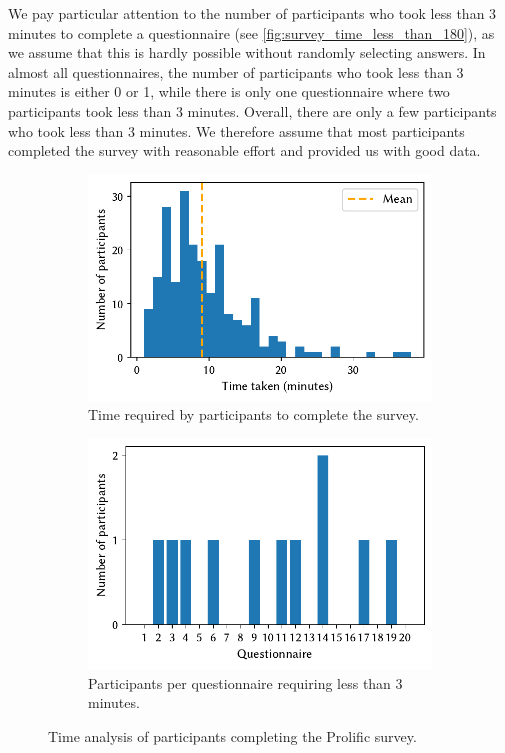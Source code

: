 \documentclass[%
class=scrreprt,
chapterprefix=false,%
open=right,%
twoside=false,%
paper=a4,%
logofile={Logo\_zentral\_farbig\_EN.png},%
thesistype=master,%
UKenglish,%
]{se2thesis}
\theoremstyle{definition}
\begin{document}
	We pay particular attention to the number of participants who took less than 3 minutes to complete a questionnaire (see \autoref{fig:survey_time_less_than_180}), as we assume that this is hardly possible without randomly selecting answers. In almost all questionnaires, the number of participants who took less than 3 minutes is either 0 or 1, while there is only one questionnaire where two participants took less than 3 minutes.
	Overall, there are only a few participants who took less than 3 minutes. We therefore assume that most participants completed the survey with reasonable effort and provided us with good data.
		
	\begin{figure}[tb]
		\centering
		\begin{subfigure}{0.49\textwidth}
			\includegraphics[width=\linewidth]{img/survey_time_histogramm.pdf}
			\caption{Time required by participants to complete the survey.}
			\label{fig:survey_time_histogramm}
		\end{subfigure}
		\hfill
		\begin{subfigure}{0.49\textwidth}
			\includegraphics[width=\linewidth]{img/survey_time_less_than_180.pdf}
			\caption{Participants per questionnaire requiring less than 3 minutes.}
			\label{fig:survey_time_less_than_180}
		\end{subfigure}
		\caption{Time analysis of participants completing the Prolific survey.}
		\label{fig:survey_time_prolific}
	\end{figure}
	
\end{document}
